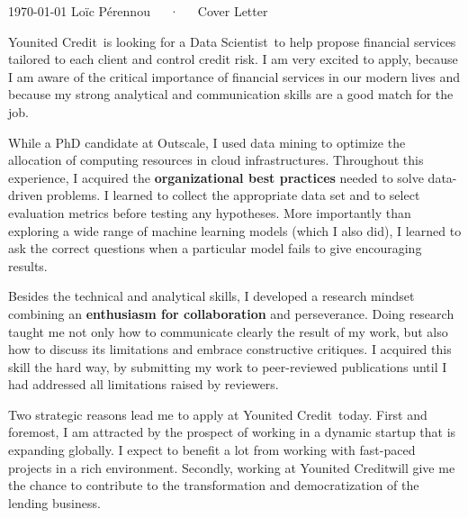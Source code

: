 \documentclass[11pt, a4paper]{awesome-cv}
\newcommand{\company}{Younited Credit}
\newcommand{\job}{Data Scientist}
\begin{document}
\makecvheader[R]

\makecvfooter
  {\today}
  {Loïc Pérennou~~~·~~~Cover Letter}
  {}

\makelettertitle

\begin{cvletter}
  \company~is looking for a \job~to help propose financial services tailored to each client and control credit risk.  
I am very excited to apply, because I am aware of the critical importance of financial services in our modern lives and because my strong analytical and communication skills are a good match for the job. 

While a PhD candidate at Outscale, I used data mining to optimize the allocation of computing resources in cloud infrastructures. 
Throughout this experience, I acquired the \textbf{organizational best practices} needed to solve data-driven problems.  
I learned to collect the appropriate data set and to select evaluation metrics before testing any hypotheses. 
More importantly than exploring a wide range of machine learning models (which I also did), I learned to ask the correct questions when a particular model fails to give encouraging results.  

Besides the technical and analytical skills, I developed a research mindset combining an \textbf{enthusiasm for collaboration} and perseverance.  
Doing research taught me not only how to communicate clearly the result of my work, but also how to discuss its limitations and embrace constructive critiques.  
I acquired this skill the hard way, by submitting my work to peer-reviewed publications until I had addressed all limitations raised by reviewers. 

Two strategic reasons lead me to apply at \company~today.   
First and foremost, I am attracted by the prospect of working in a dynamic startup that is expanding globally. I expect to benefit a lot from working with fast-paced projects in a rich environment. 
Secondly, working at \company will give me the chance to contribute to the transformation and democratization of the lending business. 


\end{cvletter}
\end{document}
